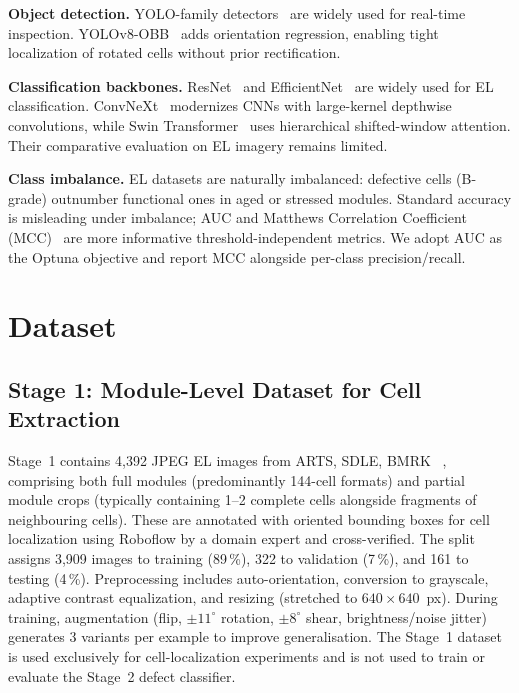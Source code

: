 \documentclass[conference]{IEEEtran}
\begin{document}
\textbf{Object detection.} YOLO-family detectors~\cite{redmon2016,jocher2023} are widely used for real-time inspection. YOLOv8-OBB~\cite{jocher2023} adds orientation regression, enabling tight localization of rotated cells without prior rectification.

\textbf{Classification backbones.} ResNet~\cite{he2016} and EfficientNet~\cite{tan2019} are widely used for EL classification. ConvNeXt~\cite{liu2022} modernizes CNNs with large-kernel depthwise convolutions, while Swin Transformer~\cite{liu2021} uses hierarchical shifted-window attention. Their comparative evaluation on EL imagery remains limited.

\textbf{Class imbalance.} EL datasets are naturally imbalanced: defective cells (B-grade) outnumber functional ones in aged or stressed modules. Standard accuracy is misleading under imbalance; AUC and Matthews Correlation Coefficient (MCC)~\cite{deitsch2019} are more informative threshold-independent metrics. We adopt AUC as the Optuna objective and report MCC alongside per-class precision/recall.

\section{Dataset}
\label{sec:dataset}

\subsection{Stage 1: Module-Level Dataset for Cell Extraction}
Stage~1 contains 4{,}392 JPEG EL images from ARTS, SDLE, BMRK ~\cite{pratt2023benchmark}, comprising both full modules (predominantly 144-cell formats) and partial module crops (typically containing 1--2 complete cells alongside fragments of neighbouring cells). These are annotated with oriented bounding boxes for cell localization using Roboflow by a domain expert and cross-verified. The split assigns 3{,}909 images to training (89\,\%), 322 to validation (7\,\%), and 161 to testing (4\,\%). Preprocessing includes auto-orientation, conversion to grayscale, adaptive contrast equalization, and resizing (stretched to $640\times640$~px). During training, augmentation (flip, $\pm11^\circ$ rotation, $\pm8^\circ$ shear, brightness/noise jitter) generates 3 variants per example to improve generalisation. The Stage~1 dataset is used exclusively for cell-localization experiments and is not used to train or evaluate the Stage~2 defect classifier.
\end{document}
